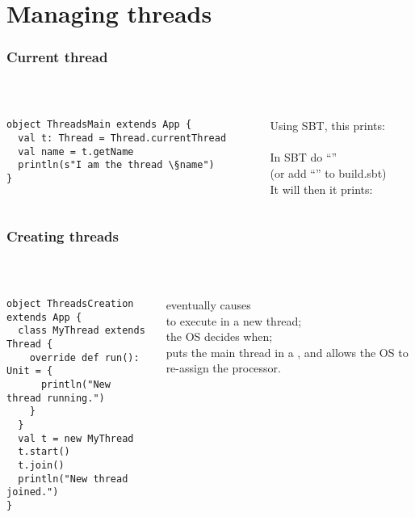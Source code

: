 \documentclass[aspectratio=169]{beamer}
\begin{document}
\section{Managing threads}

\begin{frame}[fragile]\frametitle{Current thread}
~\\[-8mm]
\begin{columns}
\begin{column}{0.49\textwidth}
\begin{lstlisting}
object ThreadsMain extends App {
  val t: Thread = Thread.currentThread
  val name = t.getName
  println(s"I am the thread \§name")
}
\end{lstlisting}
\end{column}
\begin{column}{0.49\textwidth}
Using SBT, this prints:
\\
\\[4mm]
In SBT do ``''
\\(or add ``'' to build.sbt)
\\
It will then it prints:
\\
\end{column}
\end{columns}
\end{frame}


\begin{frame}[fragile]\frametitle{Creating threads}
~\\[-8mm]
\begin{columns}
\begin{column}{0.49\textwidth}
\begin{lstlisting}[emph={start,join,run}]
object ThreadsCreation extends App {
  class MyThread extends Thread {
    override def run(): Unit = {
      println("New thread running.")
    }
  } 
  val t = new MyThread
  t.start()
  t.join()
  println("New thread joined.")
}
\end{lstlisting}
\end{column}
\begin{column}{0.49\textwidth}
\alert{} eventually causes
\\\alert{} to execute in a new thread;
\\[4mm]
the OS decides when;
\\[4mm]
\alert{} puts the main thread in a , and allows the OS to re-assign the processor.
\end{column}
\end{columns}
\end{frame}
\end{document}
